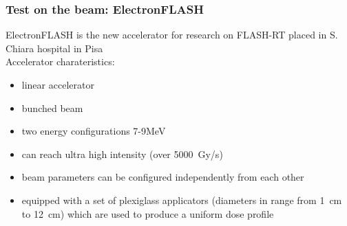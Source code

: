     \begin{frame}[noframenumbering]
        \frametitle{Test on the beam: ElectronFLASH}
        ElectronFLASH is the new accelerator for research on FLASH-RT placed in S. Chiara hospital in Pisa \\
        \medskip
        Accelerator charateristics: 
        \begin{itemize}
            \item linear accelerator
            \item bunched beam
            \item two energy configurations 7-9\si{MeV}
            \item can reach ultra high intensity (over \SI{5000}{Gy/s})
            \item beam parameters can be configured independently from each other
            \item equipped with a set of plexiglass applicators (diameters in range from \SI{1}{cm} to \SI{12}{cm}) which are used to produce a uniform dose profile 
        \end{itemize}
    \end{frame}  